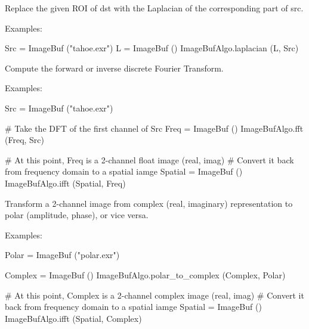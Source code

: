  
\NEW %
Replace the given ROI of {\cf dst} with the Laplacian of the corresponding
part of {\cf src}.

\smallskip
\noindent Examples:
\begin{code}
    Src = ImageBuf ("tahoe.exr")
    L = ImageBuf ()
    ImageBufAlgo.laplacian (L, Src)
\end{code}
\apiend


 
 

Compute the forward or inverse discrete Fourier Transform.

\smallskip
\noindent Examples:
\begin{code}
    Src = ImageBuf ("tahoe.exr")

    # Take the DFT of the first channel of Src
    Freq = ImageBuf ()
    ImageBufAlgo.fft (Freq, Src)

    # At this point, Freq is a 2-channel float image (real, imag)
    # Convert it back from frequency domain to a spatial iamge
    Spatial = ImageBuf ()
    ImageBufAlgo.ifft (Spatial, Freq)
\end{code}
\apiend


 
 

Transform a 2-channel image from complex (real, imaginary) representation
to polar (amplitude, phase), or vice versa.

\smallskip
\noindent Examples:
\begin{code}
    Polar = ImageBuf ("polar.exr")

    Complex = ImageBuf ()
    ImageBufAlgo.polar_to_complex (Complex, Polar)

    # At this point, Complex is a 2-channel complex image (real, imag)
    # Convert it back from frequency domain to a spatial iamge
    Spatial = ImageBuf ()
    ImageBufAlgo.ifft (Spatial, Complex)
\end{code}
\apiend




